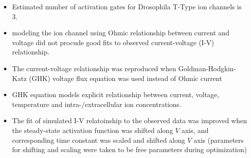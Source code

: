 \documentclass[../main.tex]{subfiles}
\begin{document}
\begin{itemize}
    \item Estimated number of activation gates for Drosophila T-Type ion channels is 3.
    \item modeling the ion channel using Ohmic relationship between current and voltage
    did not procude good fits to observed current-voltage (I-V) relationship.
    \item The current-voltage relationship was reproduced when
    Goldman-Hodgkin-Katz (GHK) voltage flux equation was used instead of Ohmic current
    \item GHK equation models explicit relationship between current, voltage, temperature and
    intra-/extracellular ion concentrations.
    \item The fit of simulated I-V relatoinship to the observed data was improved when
    the steady-state activation function was shifted along $V$ axis,
    and corresponding time constant was scaled and shifted along $V$ axis (parameters for
    shifting and scaling were taken to be free parameters during optimization)
\end{itemize}
\end{document}
